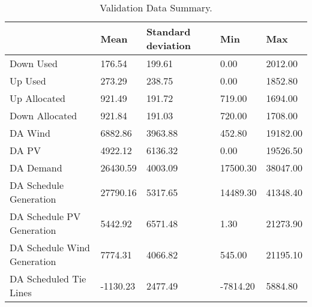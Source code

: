 \begin{table}[H] 
    \caption{Validation Data Summary. \label{validation_data_mean}}
    \begin{tabularx}{\textwidth}{CCCCC}
    \toprule
    & \textbf{Mean}	& \textbf{Standard deviation}	& \textbf{Min} & \textbf{Max}\\
    \midrule
    Down Used & 176.54 & 199.61 & 0.00 & 2012.00 \\
    Up Used & 273.29 & 238.75 & 0.00 & 1852.80 \\
    Up Allocated & 921.49 & 191.72 & 719.00 & 1694.00 \\
    Down Allocated & 921.84 & 191.03 & 720.00 & 1708.00 \\
    DA Wind & 6882.86 & 3963.88 & 452.80 & 19182.00 \\
    DA PV & 4922.12 & 6136.32 & 0.00 & 19526.50 \\
    DA Demand & 26430.59 & 4003.09 & 17500.30 & 38047.00 \\
    DA Schedule Generation & 27790.16 & 5317.65 & 14489.30 & 41348.40 \\
    DA Schedule PV Generation & 5442.92 & 6571.48 & 1.30 & 21273.90 \\
    DA Schedule Wind Generation & 7774.31 & 4066.82 & 545.00 & 21195.10 \\
    DA Scheduled Tie Lines & -1130.23 & 2477.49 & -7814.20 & 5884.80 \\
    \bottomrule
    \end{tabularx}
\end{table}
